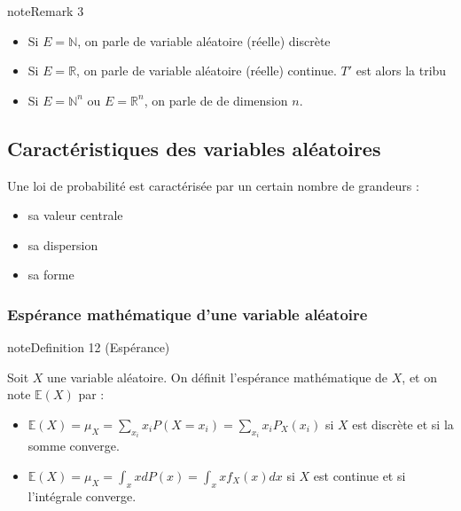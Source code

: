 \documentclass[letterpaper,10pt,french]{sphinxmanual}
\begin{document}
\begin{sphinxadmonition}{note}{Remark 3}


\begin{itemize}
\item {} 
\sphinxAtStartPar
Si \(E=\mathbb N\), on parle de variable aléatoire (réelle) discrète

\item {} 
\sphinxAtStartPar
Si \(E=\mathbb R\), on parle de variable aléatoire (réelle) continue. \(T'\) est alors la tribu 

\item {} 
\sphinxAtStartPar
Si \(E=\mathbb N^n\) ou \(E=\mathbb R^n\), on parle de  de dimension \(n\).

\end{itemize}
\end{sphinxadmonition}


\subsection{Caractéristiques des variables aléatoires}
\label{\detokenize{Rappels:caracteristiques-des-variables-aleatoires}}
\sphinxAtStartPar
Une loi de probabilité est caractérisée par un certain nombre de grandeurs :
\begin{itemize}
\item {} 
\sphinxAtStartPar
sa valeur centrale

\item {} 
\sphinxAtStartPar
sa dispersion

\item {} 
\sphinxAtStartPar
sa forme

\end{itemize}


\subsubsection{Espérance mathématique d’une variable aléatoire}
\label{\detokenize{Rappels:esperance-mathematique-d-une-variable-aleatoire}}
\ignorespaces \label{Rappels:definition-25}
\begin{sphinxadmonition}{note}{Definition 12 (Espérance)}



\sphinxAtStartPar
Soit \(X\) une variable aléatoire. On définit l’espérance mathématique de \(X\), et on note \(\mathbb E(X)\) par :
\begin{itemize}
\item {} 
\sphinxAtStartPar
\(\mathbb E(X) = \mu_X = \displaystyle\sum_{x_i} x_iP(X=x_i)= \displaystyle\sum_{x_i} x_i P_X(x_i)\) si \(X\) est discrète et si la somme converge.

\item {} 
\sphinxAtStartPar
\(\mathbb E(X) = \mu_X =\int_x xdP(x) = \int_x x f_X(x) dx\) si \(X\) est continue et si l’intégrale converge.

\end{itemize}
\end{sphinxadmonition}
\end{document}
